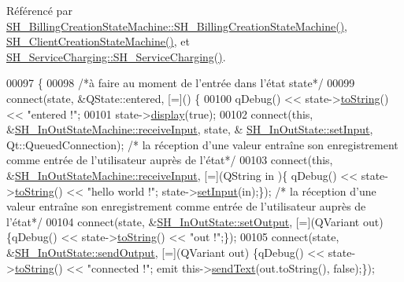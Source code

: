 Référencé par \hyperlink{classSH__BillingCreationStateMachine_ad62b77fa4aeafe200056ff3974562f83}{S\-H\-\_\-\-Billing\-Creation\-State\-Machine\-::\-S\-H\-\_\-\-Billing\-Creation\-State\-Machine()}, \hyperlink{classSH__ClientCreationStateMachine_a0b406b0f404c0fd33bf35be8ce0cc811}{S\-H\-\_\-\-Client\-Creation\-State\-Machine()}, et \hyperlink{classSH__ServiceCharging_afa5273d046049b1c2b020a6a19a8290b}{S\-H\-\_\-\-Service\-Charging\-::\-S\-H\-\_\-\-Service\-Charging()}.


\begin{DoxyCode}
00097 \{
00098     \textcolor{comment}{/*à faire au moment de l'entrée dans l'état state*/}
00099     connect(state, &QState::entered, [=]() \{
00100         qDebug() << state->\hyperlink{classSH__GenericState_a7779babbb40f3f8faa71112204d9804f}{toString}() << \textcolor{stringliteral}{"entered !"};
00101         state->\hyperlink{classSH__InOutState_a616f88b20478b81b2927a9ddc2b4f521}{display}(\textcolor{keyword}{true});
00102         connect(\textcolor{keyword}{this}, &\hyperlink{classSH__InOutStateMachine_a037ed5e13ecfae2123a8d4940292e410}{SH\_InOutStateMachine::receiveInput}, state, &
      \hyperlink{classSH__InOutState_aaec9c2b5ef7c406bff7469461352d47c}{SH\_InOutState::setInput}, Qt::QueuedConnection); \textcolor{comment}{/* la réception d'une valeur
       entraîne son enregistrement comme entrée de l'utilisateur auprès de l'état*/}
00103         connect(\textcolor{keyword}{this}, &\hyperlink{classSH__InOutStateMachine_a037ed5e13ecfae2123a8d4940292e410}{SH\_InOutStateMachine::receiveInput}, [=](QString in
      )\{ qDebug() << state->\hyperlink{classSH__GenericState_a7779babbb40f3f8faa71112204d9804f}{toString}() << \textcolor{stringliteral}{"hello world !"}; state->\hyperlink{classSH__InOutState_aaec9c2b5ef7c406bff7469461352d47c}{setInput}(in);\}); \textcolor{comment}{/* la réception
       d'une valeur entraîne son enregistrement comme entrée de l'utilisateur auprès de l'état*/}
00104         connect(state, &\hyperlink{classSH__InOutState_af611c84134e262739cd834797b315c80}{SH\_InOutState::setOutput}, [=](QVariant out) \{qDebug() << 
      state->\hyperlink{classSH__GenericState_a7779babbb40f3f8faa71112204d9804f}{toString}() << \textcolor{stringliteral}{"out !"};\});
00105         connect(state, &\hyperlink{classSH__InOutState_a77921c5f42059bc97361f4ff7827da12}{SH\_InOutState::sendOutput}, [=](QVariant out) \{qDebug() << 
      state->\hyperlink{classSH__GenericState_a7779babbb40f3f8faa71112204d9804f}{toString}() << \textcolor{stringliteral}{"connected !"}; emit this->\hyperlink{classSH__InOutStateMachine_a5e7f5958bae31696b6a8deab94ad2b4f}{sendText}(out.toString(), \textcolor{keyword}{false});\});

\end{DoxyCode}
